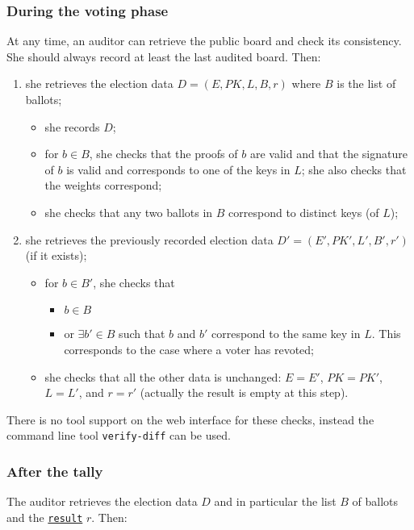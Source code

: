 \documentclass[a4paper]{article}
\newcommand{\result}{\texttt{result}}
\begin{document}
\subsubsection{During the voting phase}
\label{sec:audit-voting}
At any time, an auditor can retrieve the public board and check its consistency. She should
always record at least the last audited board. Then:
\begin{enumerate}
\item she retrieves the election data $D = (E,PK,L,B,r)$ where $B$ is the list of ballots;
  \begin{itemize}
  \item she records $D$;
  \item for $b\in B$, she checks that the proofs of $b$ are valid and that
  the signature of $b$ is valid and corresponds to one of the keys in
  $L$; she also checks that the weights correspond;
  \item she checks that any two ballots in $B$ correspond to distinct keys (of
    $L$);
  \end{itemize}
\item she retrieves the previously recorded election data $D' = (E',PK',L',B',r')$ (if it
  exists);
  \begin{itemize}
  \item for $b\in B'$, she checks that
    \begin{itemize}
    \item $b\in B$
    \item or $\exists b'\in B$ such that $b$ and $b'$ correspond to
      the same key in $L$. This corresponds to the case where a voter
      has revoted;
    \end{itemize}
    \item she checks that all the other data is unchanged: $E=E'$, $PK=PK'$, $L=L'$,
      and $r=r'$ (actually the result is empty at this step).
\end{itemize}
\end{enumerate}

There is no tool support on the web interface for these checks,
instead the command line tool \texttt{verify-diff} can be used.

\subsubsection{After the tally}
The auditor retrieves the election data $D$ and in
  particular the list $B$ of ballots and the
  \hyperref[election-result]{\result} $r$. Then:
\end{document}

